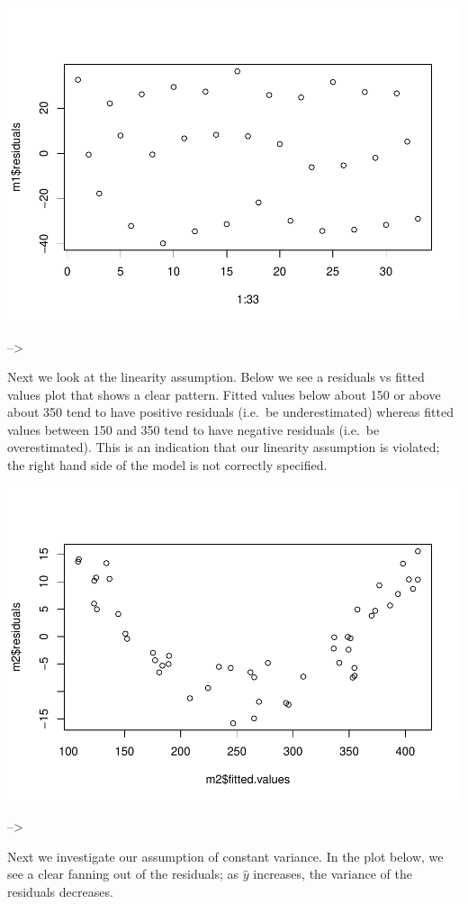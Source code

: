 \documentclass[
]{book}
\begin{document}
\includegraphics{MA206supplement_files/figure-latex/unnamed-chunk-10-1.pdf}

--\textgreater{}

Next we look at the linearity assumption. Below we see a residuals vs fitted values plot that shows a clear pattern. Fitted values below about 150 or above about 350 tend to have positive residuals (i.e.~be underestimated) whereas fitted values between 150 and 350 tend to have negative residuals (i.e.~be overestimated). This is an indication that our linearity assumption is violated; the right hand side of the model is not correctly specified.

\includegraphics{MA206supplement_files/figure-latex/unnamed-chunk-12-1.pdf}

--\textgreater{}

Next we investigate our assumption of constant variance. In the plot below, we see a clear fanning out of the residuals; as \(\hat{y}\) increases, the variance of the residuals decreases.
\end{document}
